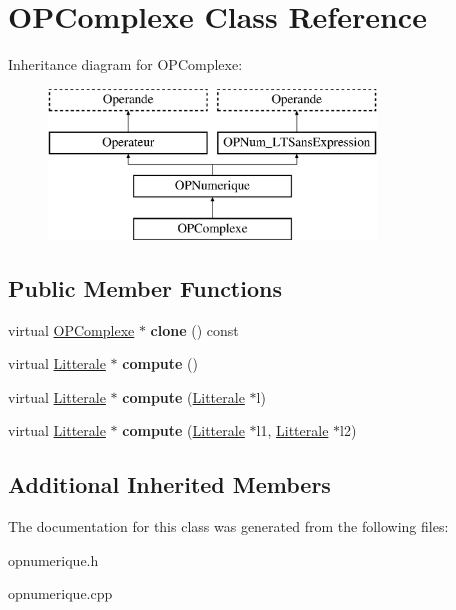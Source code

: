 \hypertarget{class_o_p_complexe}{}\section{O\+P\+Complexe Class Reference}
\label{class_o_p_complexe}
Inheritance diagram for O\+P\+Complexe\+:\begin{figure}[H]
\begin{center}
\leavevmode
\includegraphics[height=4.000000cm]{class_o_p_complexe}
\end{center}
\end{figure}
\subsection*{Public Member Functions}
\begin{DoxyCompactItemize}
\item 
virtual \hyperlink{class_o_p_complexe}{O\+P\+Complexe} $\ast$ {\bfseries clone} () const \hypertarget{class_o_p_complexe_a33aab0fa1c6518a7c2db95a5eeded964}{}\label{class_o_p_complexe_a33aab0fa1c6518a7c2db95a5eeded964}

\item 
virtual \hyperlink{class_litterale}{Litterale} $\ast$ {\bfseries compute} ()\hypertarget{class_o_p_complexe_a0579bc96abf0c5eb42949b43c411236a}{}\label{class_o_p_complexe_a0579bc96abf0c5eb42949b43c411236a}

\item 
virtual \hyperlink{class_litterale}{Litterale} $\ast$ {\bfseries compute} (\hyperlink{class_litterale}{Litterale} $\ast$l)\hypertarget{class_o_p_complexe_a14b956eb146bfa0af0bd34238735b67f}{}\label{class_o_p_complexe_a14b956eb146bfa0af0bd34238735b67f}

\item 
virtual \hyperlink{class_litterale}{Litterale} $\ast$ {\bfseries compute} (\hyperlink{class_litterale}{Litterale} $\ast$l1, \hyperlink{class_litterale}{Litterale} $\ast$l2)\hypertarget{class_o_p_complexe_a38de10b8a869b84865cb06b84ead7364}{}\label{class_o_p_complexe_a38de10b8a869b84865cb06b84ead7364}

\end{DoxyCompactItemize}
\subsection*{Additional Inherited Members}


The documentation for this class was generated from the following files\+:\begin{DoxyCompactItemize}
\item 
opnumerique.\+h\item 
opnumerique.\+cpp\end{DoxyCompactItemize}
